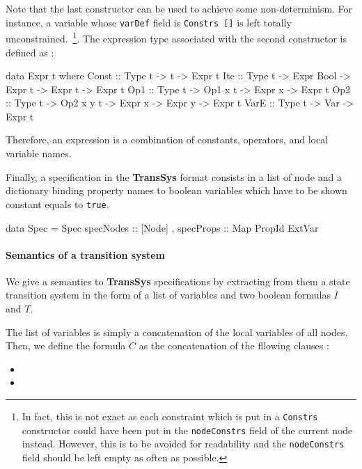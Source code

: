 Note that the last constructor can be used to achieve some non-determinism. For instance, a variable whose \texttt{varDef} field is \texttt{Constrs []} is left totally unconstrained.~\footnote{In fact, this is not exact as each constraint which is put in a \texttt{Constrs} constructor could have been put in the \texttt{nodeConstrs} field of the current node instead. However, this is to be avoided for readability and the \texttt{nodeConstrs} field should be left empty as often as possible.
}. The expression type associated with the second constructor is defined as :
\begin{code}
data Expr t where
  Const  :: Type t -> t -> Expr t
  Ite    :: Type t -> Expr Bool -> Expr t -> Expr t -> Expr t
  Op1    :: Type t -> Op1 x t -> Expr x -> Expr t
  Op2    :: Type t -> Op2 x y t -> Expr x -> Expr y -> Expr t
  VarE   :: Type t -> Var -> Expr t
\end{code}
Therefore, an expression is a combination of constants, operators, and local variable names.


Finally, a specification in the \textbf{TransSys} format consists in a list of node and a dictionary binding property names to boolean variables which have to be shown constant equals to \texttt{true}.
\begin{code}
data Spec = Spec
  { specNodes :: [Node]
  , specProps :: Map PropId ExtVar }
\end{code}


\paragraph{Semantics of a transition system}
We give a semantics to \textbf{TransSys} specifications by extracting from them a state transition system in the form of a list of variables and two boolean formulas $I$ and $T$. 

The list of variables is simply a concatenation of the local variables of all nodes. Then, we define the formula $C$ as the concatenation of the fllowing clauses :


\begin{itemize}
\item 
\item 
\end{itemize}









